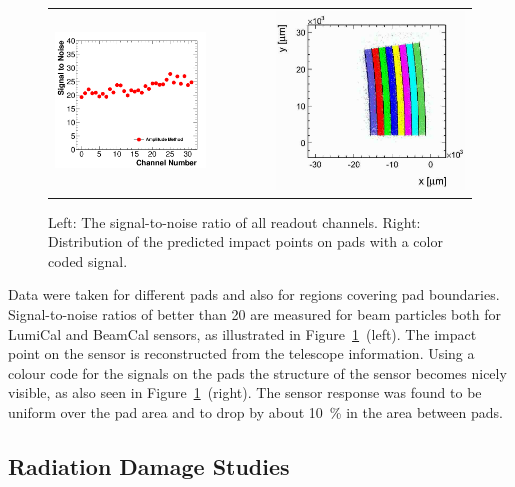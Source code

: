 \begin{figure}[htpb]
 \begin{center}
 \begin{tabular}{rrr}
  \includegraphics[width=0.45\columnwidth]{Calorimeter/FCAL/figs/StoN_AmplitudeMethod_TB11}
   &~~~~~~&
\includegraphics[width=0.45\columnwidth]{Calorimeter/FCAL/figs/hit_map_area1} \\
\end{tabular}
   \end{center}
\caption{Left: The signal-to-noise ratio of all readout channels.
         Right: Distribution of the predicted impact points on pads with a color coded signal.
}
\label{fig:sinalnoise}
\end{figure}
Data were taken for different pads and also for regions covering pad boundaries.
Signal-to-noise ratios
of better than 20 are measured for beam particles both for LumiCal and BeamCal sensors,
as illustrated in Figure~\ref{fig:sinalnoise}~(left).
The impact point on the sensor is reconstructed from the telescope information.
Using a colour code for the signals on the pads
the structure of the sensor becomes nicely visible, as also seen in Figure~\ref{fig:sinalnoise}~(right).
The sensor response was found to be uniform over the pad area and to drop by about 10~\% in the
area between pads.

\subsection{Radiation Damage Studies}


